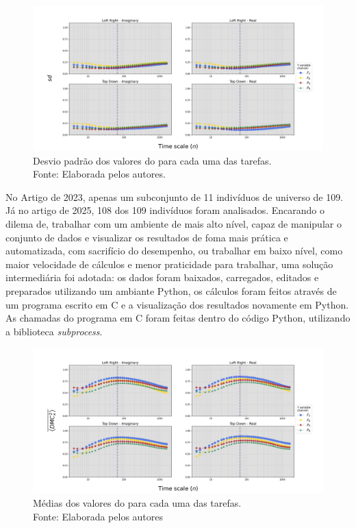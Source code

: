 \begin{figure}[!htb]
    \centering
	\includegraphics[width=.8\textwidth]{./Figures/art_01/std pop.jpg}
    \captionsetup{justification=centering}
    \caption{Desvio padrão dos valores do \dmc para cada uma das tarefas.\\Fonte: Elaborada pelos autores.}

    \label{fig:a01_sd}
	
\end{figure}

No Artigo de 2023, apenas um subconjunto de 11 indivíduos de universo de 109. Já no artigo de 2025, 108 dos 109 indivíduos foram analisados. Encarando o dilema de, trabalhar com um ambiente de mais alto nível, capaz de manipular o conjunto de dados e visualizar os resultados de foma mais prática e automatizada, com sacrifício do desempenho, ou trabalhar em baixo nível, como maior velocidade de cálculos e menor praticidade para trabalhar, uma solução intermediária foi adotada: os dados foram baixados, carregados, editados e preparados utilizando um ambiante Python, os cálculos foram feitos através de um programa escrito em C e a visualização dos resultados novamente em Python. As chamadas do programa em C foram feitas dentro do código Python, utilizando a biblioteca \emph{subprocess}.

\begin{figure}[!htb]
	\centering
	\includegraphics[width=.8\textwidth]{./Figures/art_01/mean.jpg}
    \captionsetup{justification=centering}
    \caption{Médias dos valores do \dmc para cada uma das tarefas.\\ Fonte: Elaborada pelos autores}
	\label{fig:a01_mean}
\end{figure}

